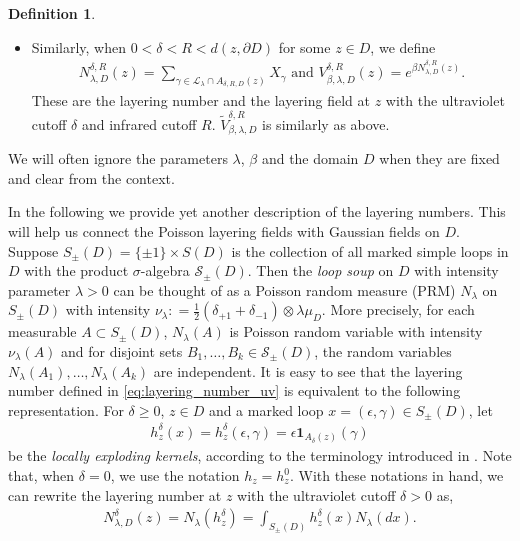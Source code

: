 \documentclass[a4paper, 11pt, reqno]{amsart}
\theoremstyle{definition} \newtheorem{defn}{Definition}[section]
\theoremstyle{remark} \newtheorem{rem}[defn]{Remark}
\theoremstyle{remark} \newtheorem*{rem*}{Remark}
\theoremstyle{plain} \newtheorem{thm}[defn]{Theorem}
\theoremstyle{plain} \newtheorem{lem}[defn]{Lemma}
\theoremstyle{plain} \newtheorem{prop}[defn]{Proposition}
\theoremstyle{plain} \newtheorem{cor}[defn]{Corollary}
\theoremstyle{remark} \newtheorem{exm}[defn]{\textbf{Example}}
\theoremstyle{remark} \newtheorem{exms}[defn]{\textbf{Examples}}
\theoremstyle{remark} \newtheorem*{bl}{}
\numberwithin{equation}{section} %
\newcommand{\mc}{\mathcal}
\newcommand{\x}{\times}
\newcommand{\ind}{\mathbf{1}}
\begin{document}
\begin{defn}
\begin{itemize}
        \item[(iii)] Similarly, when $0<\delta<R< d(z, \partial D)$ for some $z \in D$, we define
	\begin{align}\label{eq:real_LF_uv_ir}
		N^{\delta, R}_{\lambda, D}(z) = \sum_{\gamma \in \mc{L}_{\lambda}\cap A_{\delta, R, D}(z)} X_{\gamma} \text{ and } V^{\delta, R}_{\beta, \lambda, D} (z) = e^{\beta N^{\delta, R}_{\lambda, D}(z)}. 
	\end{align} 
    These are the layering number and the layering field at $z$ with the ultraviolet cutoff $\delta$ and infrared cutoff $R$. $\tilde{V}^{\delta, R}_{\beta, \lambda, D}$ is similarly as above.
	   \end{itemize}
	\end{defn}	   
    We will often ignore the parameters $\lambda$, $\beta$ and the domain $D$ when they are fixed and clear from the context. 

    In the following we provide yet another description of the layering numbers. This will help us connect the Poisson layering fields with Gaussian fields on $D$. Suppose $S_{\pm}(D) = \{\pm 1\}\x S(D)$ is the collection of all marked simple loops in $D$ with the product $\sigma$-algebra $\mc{S}_{\pm} (D)$. Then the \textit{loop soup} on $D$ with intensity parameter $\lambda >0$ can be thought of as a Poisson random measure (PRM) $N_{\lambda}$ on $S_{\pm}(D)$ with intensity $\nu_{\lambda} : = \frac{1}{2}(\delta_{+1} + \delta_{-1} ) \otimes \lambda \mu_D$. More precisely, for each measurable $A \subset S_{\pm}(D)$, $N_{\lambda}(A)$ is Poisson random variable with intensity $\nu_{\lambda}(A)$ and for disjoint sets $B_1, \ldots, B_k \in \mc{S}_{\pm} (D)$, the random variables $N_{\lambda}(A_1), \ldots, N_{\lambda}(A_k)$ are independent. It is easy to see that the layering number defined in \eqref{eq:layering_number_uv} is equivalent to the following representation. For $\delta \ge 0 $, $z \in D$ and a marked loop $x = (\epsilon, \gamma) \in S_{\pm} (D)$, let 
        \begin{align}\label{eq:locally_exploding_kernel}
            h^{\delta}_z(x) = h^{\delta}_z (\epsilon, \gamma) = \epsilon \ind_{A_{\delta}(z)}(\gamma)
        \end{align}
    be the \textit{locally exploding kernels}, according to the terminology introduced in \cite{cgpr21}. Note that, when $\delta =0$, we use the notation $h_z = h^0_z$.
    With these notations in hand, we can rewrite the layering number at $z$ with the ultraviolet cutoff $\delta>0$ as,
	\begin{align}\label{eq:layering_number_uv_1}
			N^{\delta}_{\lambda, D}(z)  = N_{\lambda} (h^{\delta}_z) = \int_{S_{\pm}(D)} h^{\delta}_z (x ) N_{\lambda}(dx).
	\end{align} 	    
	
\end{document}
